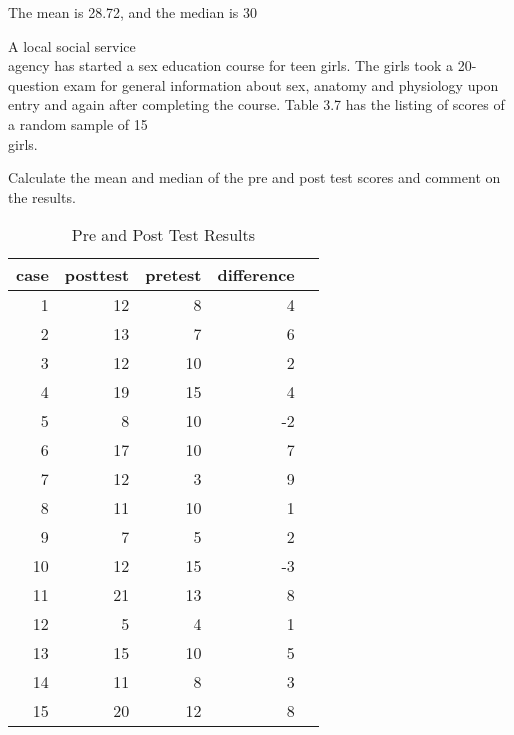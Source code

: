 \documentclass[11pt]{book}\usepackage[]{graphicx}\usepackage[]{color}
\begin{document}
\begin{exercises}
\begin{solution}
  The mean is 28.72, and the median is 30

	\end{solution}

	\begin{exercise} %

A local social service \\ agency has started a sex education course for teen girls.  The girls took a 20-question exam for general information about sex, anatomy and physiology upon entry and again after completing the course.  Table 3.7 has the listing of scores of a random sample of 15 \\ girls.

Calculate the mean and median of the pre and post test scores and comment on the results.

\begin{table}[ht]
 \centering
 \caption{Pre and Post Test Results}

 {\small{
 \begin{tabular}{@{} rrrrr @{}}
   \hline
   case & posttest & pretest & difference \\
   \hline
    1 &  12 &   8 &   4 \\
      2 &  13 &   7 &   6 \\
      3 &  12 &  10 &   2 \\
      4 &  19 &  15 &   4 \\
      5 &   8 &  10 &  -2 \\
      6 &  17 &  10 &   7 \\
      7 &  12 &   3 &   9 \\
      8 &  11 &  10 &   1 \\
      9 &   7 &   5 &   2 \\
     10 &  12 &  15 &  -3 \\
     11 &  21 &  13 &   8 \\
     12 &   5 &   4 &   1 \\
     13 &  15 &  10 &   5 \\
     14 &  11 &   8 &   3 \\
     15 &  20 &  12 &   8 \\
    \hline
 \end{tabular}
 }}

 \label{tab:t3_14}
\end{table}

	\vspace{2mm}
	\end{exercise}
	\vspace{2mm}
	\begin{solution}  %





\end{solution}
\end{exercises}
\end{document}
